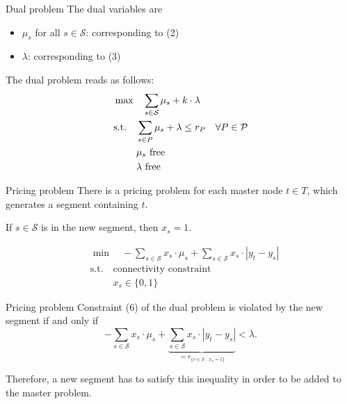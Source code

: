 \documentclass[fleqn]{beamer}
\newcommand{\superpixels}{\mathcal{S}}
\begin{document}
	\begin{frame}{Dual problem}
		The dual variables are
		\begin{itemize}
			\item $\mu_s$ for all $s\in\superpixels$: corresponding to (2)
			\item $\lambda$: corresponding to (3)
		\end{itemize}
		
		The dual problem reads as follows:
		\begin{align}
		    &\max\quad \smashoperator{\sum_{s\in\superpixels}} \mu_s + k\cdot\lambda \\
		    &\text{s.t.}\quad \sum_{s\in P} \mu_s + \lambda \leq r_P \quad\forall P\in\mathcal{P} \\
		    &\phantom{\text{s.t.}\quad} \mu_s \text{ free} \\
		    &\phantom{\text{s.t.}\quad} \lambda \text{ free}
		\end{align}
	\end{frame}
	
	\begin{frame}{Pricing problem}
		There is a pricing problem for each master node $t\in T$,
		which generates a segment containing $t$.
		
		If $s\in\superpixels$ is in the new segment, then $x_s=1$.		
		 
		\begin{align}
    		&\min\quad -\sum_{s\in\superpixels} x_s\cdot\mu_s + \sum_{s\in\superpixels} x_s\cdot|y_t-y_s| \\
    		&\text{s.t.}\quad \text{connectivity constraint} \\
	    	&\phantom{\text{s.t.}\quad} x_s \in\{0,1\}
		\end{align}
	\end{frame}
	
	\begin{frame}{Pricing problem}
		Constraint (6) of the dual problem is violated by the new segment if and only if
		\[-\sum_{s\in\superpixels} x_s\cdot\mu_s + \underbrace{\sum_{s\in\superpixels} x_s\cdot|y_t-y_s|}_{=r_{\{s\in\superpixels\ :\ x_s=1\}}} < \lambda.\]
        
		Therefore, a new segment has to satisfy this inequality in order to be added to the master problem.
	\end{frame}
    
\end{document}
